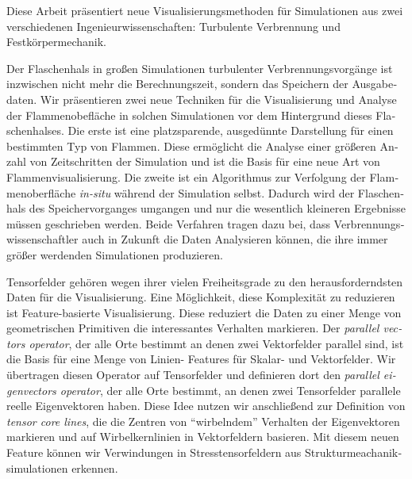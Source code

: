 \begin{otherlanguage}{german}%
%
Diese Arbeit präsentiert neue Visualisierungsmethoden für Simulationen aus zwei
verschiedenen Ingenieurwissenschaften: Turbulente Verbrennung und
Festkörpermechanik.
%

%
Der Flaschenhals in großen Simulationen turbulenter Verbrennungsvorgänge ist
inzwischen nicht mehr die Berechnungszeit, sondern das Speichern der
Ausgabedaten.
%
Wir präsentieren zwei neue Techniken für die Visualisierung und Analyse der
Flammenobefläche in solchen Simulationen vor dem Hintergrund dieses
Flaschenhalses.
%
Die erste ist eine platzsparende, ausgedünnte Darstellung für einen bestimmten
Typ von Flammen.
%
Diese ermöglicht die Analyse einer größeren Anzahl von Zeitschritten der
Simulation und ist die Basis für eine neue Art von Flammenvisualisierung.
%
Die zweite ist ein Algorithmus zur Verfolgung der Flammenoberfläche
\emph{in-situ} während der Simulation selbst.
%
Dadurch wird der Flaschenhals des Speichervorganges umgangen und nur die
wesentlich kleineren Ergebnisse müssen geschrieben werden.
%
Beide Verfahren tragen dazu bei, dass Verbrennungswissenschaftler auch in
Zukunft die Daten Analysieren können, die ihre immer größer werdenden
Simulationen produzieren.
%

%
Tensorfelder gehören wegen ihrer vielen Freiheitsgrade zu den herausforderndsten
Daten für die Visualisierung.
%
Eine Möglichkeit, diese Komplexität zu reduzieren ist Feature-basierte
Visualisierung.
%
Diese reduziert die Daten zu einer Menge von geometrischen Primitiven die
interessantes Verhalten markieren.
%
Der \emph{parallel vectors operator}, der alle Orte bestimmt an denen zwei
Vektorfelder parallel sind, ist die Basis für eine Menge von Linien- Features
für Skalar- und Vektorfelder.
%
Wir übertragen diesen Operator auf Tensorfelder und definieren dort den
\emph{parallel eigenvectors operator}, der alle Orte bestimmt, an denen zwei
Tensorfelder parallele reelle Eigenvektoren haben.
%
Diese Idee nutzen wir anschließend zur Definition von \emph{tensor core lines},
die die Zentren von ``wirbelndem'' Verhalten der Eigenvektoren markieren und
auf Wirbelkernlinien in Vektorfeldern basieren.
%
Mit diesem neuen Feature können wir Verwindungen in Stresstensorfeldern aus
Strukturmeachaniksimulationen erkennen.
%
\end{otherlanguage}%